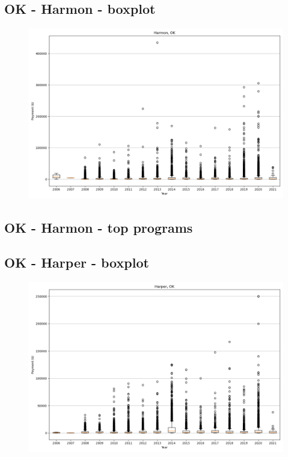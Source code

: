 \subsection*{OK - Harmon - boxplot}
\begin{figure}[h]
\centering
\includegraphics[width=7in]{../output/boxplots/counties/Harmon-OK_boxplot.png}
\end{figure}


\subsection*{OK - Harmon - top programs}

\newpage
\subsection*{OK - Harper - boxplot}
\begin{figure}[h]
\centering
\includegraphics[width=7in]{../output/boxplots/counties/Harper-OK_boxplot.png}
\end{figure}


